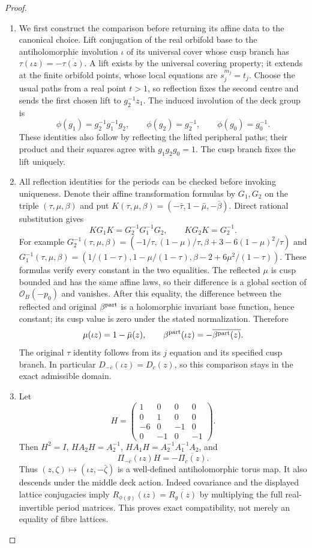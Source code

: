 \begin{proof}
\begin{enumerate}[label=\arabic*.,leftmargin=*]
\item We first construct the comparison before returning its affine data to the canonical choice. Lift conjugation of the real orbifold base to the antiholomorphic involution $\iota$ of its universal cover whose cusp branch has $\tau(\iota z)=-\overline{\tau(z)}$. A lift exists by the universal covering property; it extends at the finite orbifold points, whose local equations are $s_j^{m_j}=t_j$. Choose the usual paths from a real point $t>1$, so reflection fixes the second centre and sends the first chosen lift to $g_2^{-1}z_1$. The induced involution of the deck group is
\[
 \phi(g_1)=g_2^{-1}g_1^{-1}g_2,\qquad
 \phi(g_2)=g_2^{-1},\qquad \phi(g_0)=g_0^{-1}.
\]
These identities also follow by reflecting the lifted peripheral paths; their product and their squares agree with $g_1g_2g_0=1$. The cusp branch fixes the lift uniquely.

\item All reflection identities for the periods can be checked before invoking uniqueness. Denote their affine transformation formulas by $G_1,G_2$ on the triple $(\tau,\mu,\beta)$ and put $K(\tau,\mu,\beta)=(-\bar\tau,1-\bar\mu,-\bar\beta)$. Direct rational substitution gives
\[
 KG_1K=G_2^{-1}G_1^{-1}G_2,\qquad KG_2K=G_2^{-1}.
\]
For example $G_2^{-1}(\tau,\mu,\beta)=(-1/\tau,(1-\mu)/\tau,\beta+3-6(1-\mu)^2/\tau)$ and
$G_1^{-1}(\tau,\mu,\beta)=(1/(1-\tau),1-\mu/(1-\tau),\beta-2+6\mu^2/(1-\tau))$. These formulas verify every constant in the two equalities. The reflected $\mu$ is cusp bounded and has the same affine laws, so their difference is a global section of $\mathcal O_B(-p_0)$ and vanishes. After this equality, the difference between the reflected and original $\beta^{\rm part}$ is a holomorphic invariant base function, hence constant; its cusp value is zero under the stated normalization. Therefore
\[
 \mu(\iota z)=1-\bar\mu(z),\qquad
 \beta^{\rm part}(\iota z)=-\overline{\beta^{\rm part}(z)}.
\]
The original $\tau$ identity follows from its $j$ equation and its specified cusp branch. In particular $D_{-\bar c}(\iota z)=D_c(z)$, so this comparison stays in the exact admissible domain.

\item Let
\[
 H=\begin{pmatrix}1&0&0&0\\0&1&0&0\\-6&0&-1&0\\0&-1&0&-1\end{pmatrix}.
\]
Then $H^2=I$, $HA_2H=A_2^{-1}$, $HA_1H=A_2^{-1}A_1^{-1}A_2$, and
\[
 \Pi_{-\bar c}(\iota z)H=-\overline{\Pi_c(z)}.
\]
Thus $(z,\zeta)\mapsto(\iota z,-\bar\zeta)$ is a well-defined antiholomorphic torus map. It also descends under the middle deck action. Indeed covariance and the displayed lattice conjugacies imply $R_{\phi(g)}(\iota z)=\overline{R_g(z)}$ by multiplying the full real-invertible period matrices. This proves exact compatibility, not merely an equality of fibre lattices.


\end{enumerate}
\end{proof}
